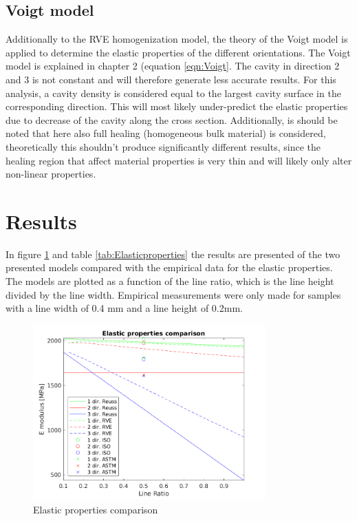 \subsection{Voigt model}
Additionally to the RVE homogenization model, the theory of the Voigt model is applied to determine the elastic properties of the different orientations. The Voigt model is explained in chapter 2 (equation \ref{eqn:Voigt}. The cavity in direction 2 and 3 is not constant and will therefore generate less accurate results. For this analysis, a cavity density is considered equal to the largest cavity surface in the corresponding direction. This will most likely under-predict the elastic properties due to decrease of the cavity along the cross section. Additionally, is should be noted that here also full healing (homogeneous bulk material) is considered, theoretically this shouldn't produce significantly different results, since the healing region that affect material properties is very thin and will likely only alter non-linear properties. 

\section{Results}
In figure \ref{fig:Elasticproperties}  and table \ref{tab:Elasticproperties} the results are presented of the two presented models compared with the empirical data for the elastic properties.  The models are plotted as a function of the line ratio, which is the line height divided by the line width. Empirical measurements were only made for samples with a line width of 0.4 mm and a line height of 0.2mm.

\begin{figure}[H]
    \centering
    \includegraphics[width=0.80\textwidth]{chapter_6_Elasticmodelling/figures/Elasticproperties.png}
    \caption{Elastic properties comparison}
    \label{fig:Elasticproperties}
\end{figure}


